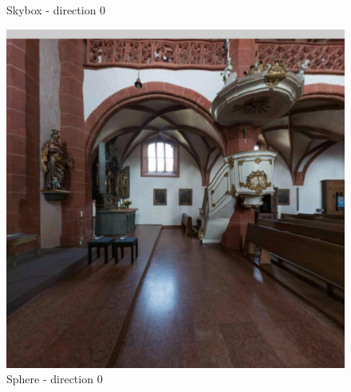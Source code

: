 \documentclass[12pt]{article}
\begin{document}
\begin{figure}[H]
\begin{minipage}[b]{0.3\textwidth}
    \caption{Skybox - direction 0}
    \label{fig:skybox_direction_0}
  \end{minipage}
  \hfill
  \begin{minipage}[b]{0.3\textwidth}
    \centering
    \includegraphics[width=1\textwidth]{../images/screenshots/Screenshot_0_Sphere.jpg}
    \caption{Sphere - direction 0}
    \label{fig:sphere_direction_0}
  \end{minipage}
\end{figure}
\end{document}
